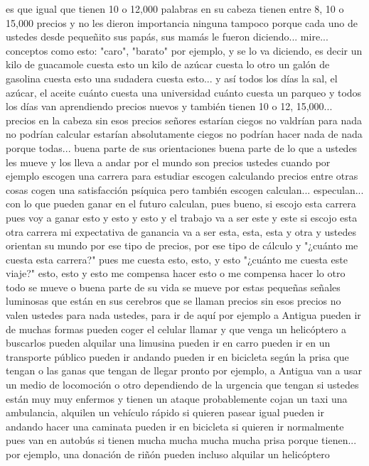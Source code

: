 es que igual que tienen 10 o 12,000 palabras en su cabeza tienen entre 8, 10 o 15,000 precios y no les dieron importancia ninguna tampoco
porque cada uno de ustedes desde pequeñito sus papás, sus mamás le fueron diciendo... mire... conceptos como esto: "caro", "barato"
por ejemplo, y se lo va diciendo, es decir un kilo de guacamole cuesta esto un kilo de azúcar cuesta lo otro
un galón de gasolina cuesta esto una sudadera cuesta esto...
y así todos los días la sal, el azúcar, el aceite cuánto cuesta una universidad cuánto cuesta un parqueo y todos los días van aprendiendo precios nuevos
y también tienen 10 o 12, 15,000... precios en la cabeza sin esos precios señores estarían ciegos
no valdrían para nada no podrían calcular estarían absolutamente ciegos no podrían hacer nada de nada porque todas...
buena parte de sus orientaciones buena parte de lo que a ustedes les mueve y los lleva a andar por el mundo
son precios ustedes cuando por ejemplo escogen una carrera para estudiar escogen calculando precios
entre otras cosas cogen una satisfacción psíquica pero también escogen calculan... especulan...
con lo que pueden ganar en el futuro calculan, pues bueno, si escojo esta carrera pues voy a ganar esto y esto y esto
y el trabajo va a ser este y este si escojo esta otra carrera mi expectativa de ganancia va a ser esta, esta, esta y otra y ustedes orientan
su mundo por ese tipo de precios, por ese tipo de cálculo y "¿cuánto me cuesta esta carrera?" pues me cuesta esto, esto, y esto "¿cuánto me cuesta este viaje?"
esto, esto y esto me compensa hacer esto o me compensa hacer lo otro todo se mueve o buena parte de su vida se mueve por estas
pequeñas señales luminosas que están en sus cerebros que se llaman precios sin esos precios no valen ustedes para nada
ustedes, para ir de aquí por ejemplo a Antigua pueden ir de muchas formas
pueden coger el celular llamar y que venga un helicóptero a buscarlos
pueden alquilar una limusina pueden ir en carro pueden ir en un transporte público
pueden ir andando pueden ir en bicicleta según la prisa que tengan
o las ganas que tengan de llegar pronto por ejemplo, a Antigua van a usar un medio de locomoción o otro
dependiendo de la urgencia que tengan si ustedes están muy muy enfermos y tienen un ataque probablemente cojan un taxi una ambulancia, alquilen un vehículo rápido
si quieren pasear igual pueden ir andando hacer una caminata pueden ir en bicicleta si quieren ir normalmente pues van en autobús
si tienen mucha mucha mucha mucha prisa porque tienen... por ejemplo, una donación de riñón pueden incluso alquilar un helicóptero
